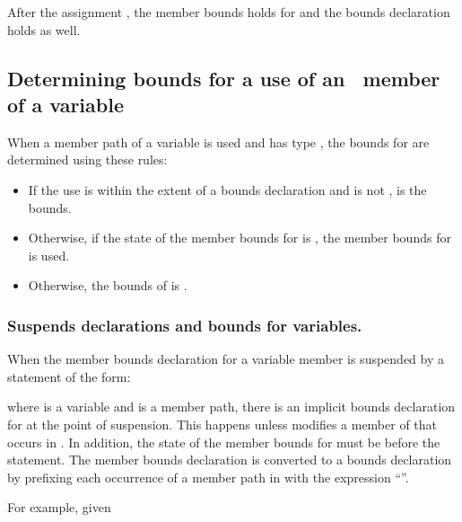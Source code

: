 After the assignment , the member bounds holds for
 and the bounds declaration 
holds as well.

\subsection{Determining bounds for a use of an \arrayptr\ member of a variable}
\label{section:determining-variable-member-bounds}

When a member path  of a variable  is used and
 has type \arrayptr, the bounds for
 are determined using these rules:

\begin{itemize}
\item
  If the use is within the extent of a bounds declaration
   \code{:}  and
   is not \boundsunknown,  is
  the bounds.
\item
  Otherwise, if the state of the member bounds for
   is , the member bounds for
   is used.
\item
  Otherwise, the bounds of  is
  \boundsunknown.
\end{itemize}

\subsubsection{Suspends declarations and bounds for variables.}

When the member bounds declaration  for a variable member is
suspended by a statement of the form:

  \code{);}

where  is a variable and  is a member path, there is an
implicit bounds declaration for  at the point
of suspension. This happens unless  modifies a member 
of  that occurs in . In addition, the state of the
member bounds for  must be 
before the statement. The member bounds declaration  is
converted to a bounds declaration by prefixing each occurrence of a
member path in  with the expression ``''.

For example, given

